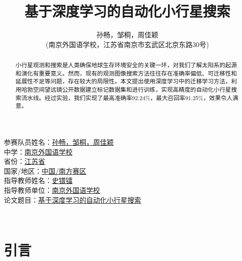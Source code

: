 \documentclass[12pt,a4paper]{article}%
\title{\fontsize{18pt}{27pt}\selectfont%
	{\heiti%
    基于深度学习的自动化小行星搜索}}%
\author{\fontsize{12pt}{18pt}\selectfont%
	{\fangsong%
		孙畅，邹桐，周佳颖 }\\%
	\fontsize{10.5pt}{15.75pt}\selectfont%
	{\fangsong%
		(南京外国语学校，江苏省南京市玄武区北京东路30号)}}%
\date{}%
\begin{document}

\begin{titlepage}
    \begin{flushleft}
        \fontsize{22pt}{40pt}\selectfont
        参赛队员姓名：\underline{孙畅，邹桐，周佳颖} \\
        中学：\underline{南京外国语学校}\\
        省份：\underline{江苏省}\\
        国家/地区：\underline{中国/南方赛区}\\
        指导教师姓名：\underline{史镨镭}\\
        指导教师单位：\underline{南京外国语学校}\\
        论文题目：\underline{基于深度学习的自动化小行星搜索}
    \end{flushleft}
\end{titlepage}

\maketitle%
\lhead{}%
\chead{}%
\rhead{}%
\lfoot{}%
\cfoot{\thepage}%
\rfoot{}%
\begin{abstract}
    \fangsong 小行星观测和搜索是人类确保地球生存环境安全的关键一环，对我们了解太阳系的起源和演化有重要意义。然而，现有的观测图像搜索方法往往存在准确率偏低、可迁移性和延展性不足等问题，存在较大的局限性。本文提出使用深度学习中的迁移学习方法，利用哈勃空间望远镜公开数据建立标记数据集和进行训练，实现高精度的自动化小行星搜索流水线。经过实验，我们实现了最高准确率92.24\%，最大召回率91.25\%，效果令人满意。
\end{abstract}

\begin{adjustwidth}{1.06cm}{1.06cm}
    \fontsize{10.5pt}{15.75pt}\\
\end{adjustwidth}

\newpage

\tableofcontents

\newpage

\section{引言}
\end{document}

